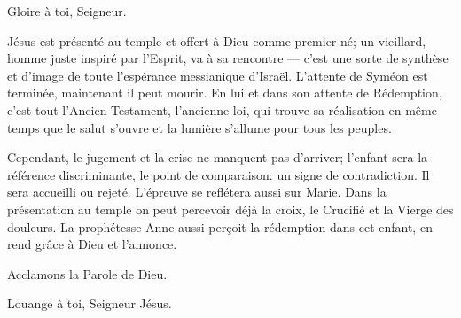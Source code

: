 \rubricatum{\Rbardot{}} Gloire à toi, Seigneur.

Jésus est présenté au temple et offert à Dieu comme premier-né; un
vieillard, homme juste inspiré par l'Esprit, va à sa rencontre — c'est une
sorte de synthèse et d'image de toute l'espérance messianique d'Israël.
L'attente de Syméon est terminée, maintenant il peut mourir. En lui et dans
son attente de Rédemption, c'est tout l'Ancien Testament, l'ancienne loi,
qui trouve sa réalisation en même temps que le salut s'ouvre et la lumière
s'allume pour tous les peuples.

Cependant, le jugement et la crise ne
manquent pas d'arriver; l'enfant sera la référence discriminante, le point
de comparaison: un signe de contradiction. Il sera accueilli ou rejeté.
L'épreuve se reflétera aussi sur Marie. Dans la présentation au temple on
peut percevoir déjà la croix, le Crucifié et la Vierge des douleurs. La
prophétesse Anne aussi perçoit la rédemption dans cet enfant, en rend grâce
à Dieu et l'annonce.

Acclamons la Parole de Dieu.

\rubricatum{\Rbardot{}} Louange à toi, Seigneur Jésus.
